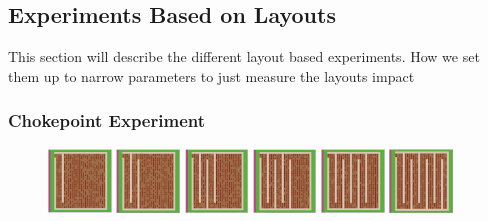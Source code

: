 \documentclass[12pt,letterpaper]{article}
\begin{document}
\subsection{Experiments Based on Layouts}
This section will describe the different layout based experiments.  How we set them up to narrow parameters to just measure the layouts impact

\subsubsection{Chokepoint Experiment}

\begin{figure}[ht]
  \centering
  \begin{minipage}[b]{\linewidth}
    \includegraphics[width=0.15\textwidth]{./figures/chokepoint_1_a.png}
    \includegraphics[width=0.15\textwidth]{./figures/chokepoint_1_b.png}
    \includegraphics[width=0.15\textwidth]{./figures/chokepoint_1_c.png}
    \includegraphics[width=0.15\textwidth]{./figures/chokepoint_1_d.png}
    \includegraphics[width=0.15\textwidth]{./figures/chokepoint_1_e.png}
    \includegraphics[width=0.15\textwidth]{./figures/chokepoint_1_f.png}

\end{minipage}
\end{figure}
\end{document}
